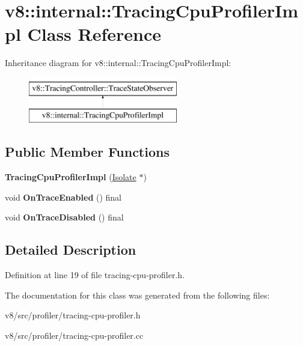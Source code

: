 \hypertarget{classv8_1_1internal_1_1TracingCpuProfilerImpl}{}\section{v8\+:\+:internal\+:\+:Tracing\+Cpu\+Profiler\+Impl Class Reference}
\label{classv8_1_1internal_1_1TracingCpuProfilerImpl}
Inheritance diagram for v8\+:\+:internal\+:\+:Tracing\+Cpu\+Profiler\+Impl\+:\begin{figure}[H]
\begin{center}
\leavevmode
\includegraphics[height=2.000000cm]{classv8_1_1internal_1_1TracingCpuProfilerImpl}
\end{center}
\end{figure}
\subsection*{Public Member Functions}
\begin{DoxyCompactItemize}
\item 
\mbox{\label{classv8_1_1internal_1_1TracingCpuProfilerImpl_a84669ceb457c5d8a0c1050512bed3564}} 
{\bfseries Tracing\+Cpu\+Profiler\+Impl} (\mbox{\hyperlink{classv8_1_1internal_1_1Isolate}{Isolate}} $\ast$)
\item 
\mbox{\label{classv8_1_1internal_1_1TracingCpuProfilerImpl_acfff3600859a5a6d1cfc98b8dd196e58}} 
void {\bfseries On\+Trace\+Enabled} () final
\item 
\mbox{\label{classv8_1_1internal_1_1TracingCpuProfilerImpl_a9938a247f244f94a5d56ee550cc2aa4c}} 
void {\bfseries On\+Trace\+Disabled} () final
\end{DoxyCompactItemize}


\subsection{Detailed Description}


Definition at line 19 of file tracing-\/cpu-\/profiler.\+h.



The documentation for this class was generated from the following files\+:\begin{DoxyCompactItemize}
\item 
v8/src/profiler/tracing-\/cpu-\/profiler.\+h\item 
v8/src/profiler/tracing-\/cpu-\/profiler.\+cc\end{DoxyCompactItemize}
